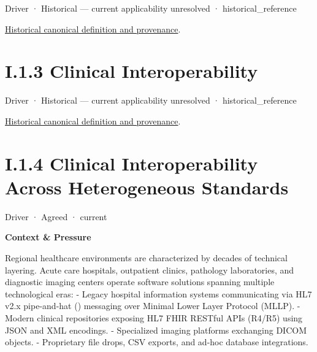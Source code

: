 \label{element:499313a0a5d84520a3061120ae9b6dac}
{\small Driver · Historical — current applicability unresolved · historical\_reference}\par
\href{../../../../continuum/motivation/driver/499313a0a5d84520a3061120ae9b6dac.md}{Historical canonical definition and provenance}.\par
\section*{I.1.3 Clinical Interoperability}
\label{navigation:I.1.3}

\label{element:babb9f5d63d8435890c1db3579ec78d9}
{\small Driver · Historical — current applicability unresolved · historical\_reference}\par
\href{../../../../continuum/motivation/driver/babb9f5d63d8435890c1db3579ec78d9.md}{Historical canonical definition and provenance}.\par
\section*{I.1.4 Clinical Interoperability Across Heterogeneous Standards}
\label{navigation:I.1.4}

\label{element:921d7cf84d2b4abca0deb0d300fa75ea}
{\small Driver · Agreed · current}\par

\par\medskip\textbf{Context \& Pressure}\par


Regional healthcare environments are characterized by decades of technical layering. Acute care hospitals, outpatient clinics, pathology laboratories, and diagnostic imaging centers operate software solutions spanning multiple technological eras:
- Legacy hospital information systems communicating via HL7 v2.x pipe-and-hat (\texttt{}) messaging over Minimal Lower Layer Protocol (MLLP).
- Modern clinical repositories exposing HL7 FHIR RESTful APIs (R4/R5) using JSON and XML encodings.
- Specialized imaging platforms exchanging DICOM objects.
- Proprietary file drops, CSV exports, and ad-hoc database integrations.



